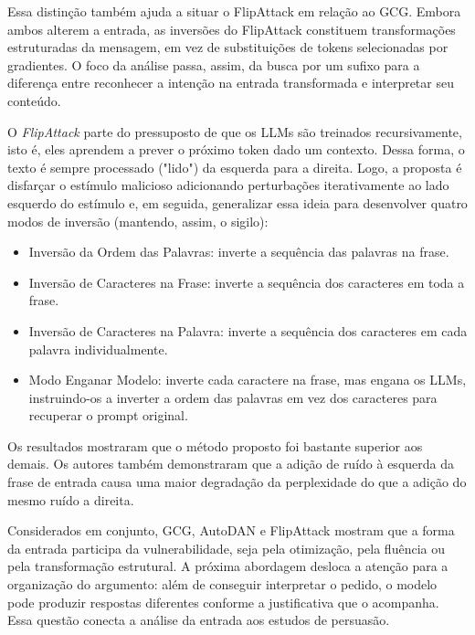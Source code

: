 Essa distinção também ajuda a situar o FlipAttack em relação ao GCG. Embora ambos alterem a entrada, as inversões do FlipAttack constituem transformações estruturadas da mensagem, em vez de substituições de tokens selecionadas por gradientes. O foco da análise passa, assim, da busca por um sufixo para a diferença entre reconhecer a intenção na entrada transformada e interpretar seu conteúdo.

O \textit{FlipAttack} parte do pressuposto de que os LLMs são treinados recursivamente, isto é,
eles aprendem a prever o próximo token dado um contexto. Dessa forma, o texto é sempre processado ("lido")
da esquerda para a direita. Logo, a proposta é disfarçar o estímulo malicioso adicionando
perturbações iterativamente ao lado esquerdo do estímulo e, em seguida, generalizar essa
ideia para desenvolver quatro modos de inversão (mantendo, assim, o sigilo):

\begin{itemize}
    \item Inversão da Ordem das Palavras: inverte a sequência das palavras na frase.
    \item Inversão de Caracteres na Frase: inverte a sequência dos caracteres em toda a frase.
    \item Inversão de Caracteres na Palavra: inverte a sequência dos caracteres em cada
    palavra individualmente.
    \item Modo Enganar Modelo: inverte cada caractere na frase, mas engana os LLMs,
    instruindo-os a inverter a ordem das palavras em vez dos caracteres para recuperar
    o prompt original.
\end{itemize}

Os resultados mostraram que o método proposto foi bastante superior aos demais. Os autores
também demonstraram que a adição de ruído à esquerda da frase de entrada causa uma maior degradação
da perplexidade do que a adição do mesmo ruído a direita.


Considerados em conjunto, GCG, AutoDAN e FlipAttack mostram que a forma da entrada participa da vulnerabilidade, seja pela otimização, pela fluência ou pela transformação estrutural. A próxima abordagem desloca a atenção para a organização do argumento: além de conseguir interpretar o pedido, o modelo pode produzir respostas diferentes conforme a justificativa que o acompanha. Essa questão conecta a análise da entrada aos estudos de persuasão.
